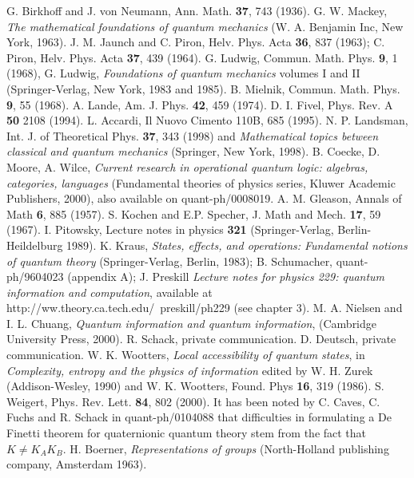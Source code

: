 \documentclass[10pt,twocolumn]{article}
\begin{document}
\begin{thebibliography}{00}
 G. Birkhoff and J. von Neumann, Ann. Math. {\bf 37},
743 (1936).
 G. W. Mackey, {\it The mathematical foundations of
quantum mechanics} (W. A. Benjamin Inc, New York, 1963).
 J. M. Jaunch and C. Piron, Helv. Phys. Acta {\bf 36},
837 (1963); C. Piron, Helv. Phys. Acta {\bf 37}, 439 (1964).
 G. Ludwig, Commun. Math. Phys. {\bf 9}, 1 (1968), G.
Ludwig, {\it Foundations of quantum mechanics} volumes I and II
(Springer-Verlag, New York, 1983 and 1985).
 B. Mielnik, Commun. Math. Phys. {\bf 9}, 55 (1968).
 A. Lande, Am. J. Phys. {\bf 42}, 459 (1974).
 D. I. Fivel, Phys. Rev. A {\bf 50} 2108 (1994).
 L. Accardi, Il Nuovo Cimento 110B, 685 (1995).
 N. P. Landsman, Int. J. of Theoretical Phys. {\bf
37}, 343 (1998) and {\it Mathematical topics between classical and
quantum mechanics} (Springer, New York, 1998).
 B. Coecke, D. Moore, A. Wilce, {\it Current research in
operational quantum logic: algebras, categories, languages} (Fundamental
theories of physics series, Kluwer Academic Publishers, 2000), also
available on quant-ph/0008019.
 A. M. Gleason, Annals of Math {\bf 6}, 885 (1957).
 S. Kochen and E.P. Specher, J. Math and Mech. {\bf 17},
59 (1967).
 I. Pitowsky, Lecture notes in physics {\bf 321}
(Springer-Verlag, Berlin-Heildelburg 1989).
 K. Kraus, {\it States, effects, and operations:
Fundamental notions of quantum theory} (Springer-Verlag, Berlin, 1983);
B. Schumacher, quant-ph/9604023 (appendix A); J. Preskill {\it Lecture
notes for physics 229: quantum information and computation}, available
at http://ww.theory.ca.tech.edu/~preskill/ph229 (see chapter 3).
 M. A. Nielsen and I. L. Chuang, {\it Quantum
information and quantum information}, (Cambridge University Press,
2000).
 R. Schack, private communication.
 D. Deutsch, private communication.
 W. K. Wootters, {\it Local accessibility of quantum
states}, in {\it Complexity, entropy and the physics of information}
edited by W. H. Zurek (Addison-Wesley, 1990) and W. K. Wootters, Found.
Phys {\bf 16}, 319 (1986).
 S. Weigert, Phys. Rev. Lett. {\bf 84}, 802 (2000).
 It has been noted by C. Caves, C. Fuchs and R. Schack in
quant-ph/0104088 that difficulties in formulating a De Finetti theorem for
quaternionic quantum theory stem from the fact that $K\not=K_AK_B$.
 H. Boerner, {\it Representations of groups}
(North-Holland publishing company, Amsterdam 1963).
\end{thebibliography}
\end{document}
